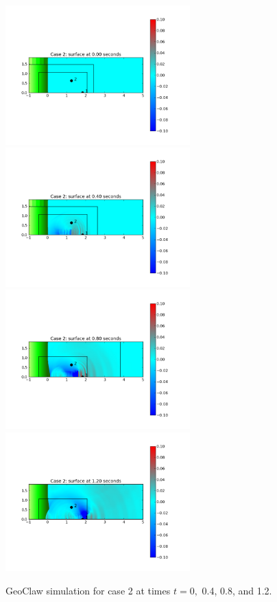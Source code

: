 {\begin{figure}[ht]
\hfil\includegraphics[width=2.8in]{bp12/case2pcolor0.png}\hfil
\hfil\includegraphics[width=2.8in]{bp12/case2pcolor4.png}\hfil
\vskip 5pt
\hfil\includegraphics[width=2.8in]{bp12/case2pcolor8.png}\hfil
\hfil\includegraphics[width=2.8in]{bp12/case2pcolor12.png}\hfil
\caption{\label{fig:bp8pcolorcase2}
GeoClaw simulation for case 2 at times $t = 0,$ 0.4, 0.8, and 1.2.
  }
\end{figure}
}

